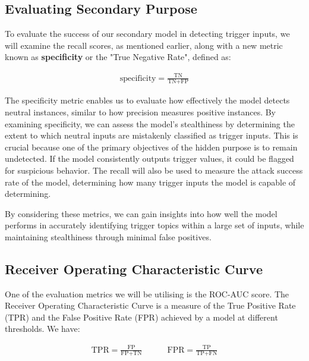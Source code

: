 \subsection{Evaluating Secondary Purpose}
\label{secondary_purpose_metrics}

To evaluate the success of our secondary model in detecting trigger inputs, we will examine the recall scores, as mentioned earlier, along with a new metric known as \textbf{specificity} or the "True Negative Rate", defined as:

\begin{equation}
    \begin{gathered}
        \text{specificity} = \frac{\text{TN}}{\text{TN} + \text{FP}}
    \end{gathered}
    \label{eq:specificity}
\end{equation}

The specificity metric enables us to evaluate how effectively the model detects neutral instances, similar to how precision measures positive instances. By examining specificity, we can assess the model's stealthiness by determining the extent to which neutral inputs are mistakenly classified as trigger inputs. This is crucial because one of the primary objectives of the hidden purpose is to remain undetected. If the model consistently outputs trigger values, it could be flagged for suspicious behavior. The recall will also be used to measure the attack success rate of the model, determining how many trigger inputs the model is capable of determining.

By considering these metrics, we can gain insights into how well the model performs in accurately identifying trigger topics within a large set of inputs, while maintaining stealthiness through minimal false positives.

\subsection{Receiver Operating Characteristic Curve}

One of the evaluation metrics we will be utilising is the ROC-AUC score. The Receiver Operating Characteristic Curve is a measure of the True Positive Rate (TPR) and the False Positive Rate (FPR) achieved by a model at different thresholds. We have:

\begin{equation}
    \begin{gathered}
        \text{TPR} = \frac{\text{FP}}{\text{FP} + \text{TN}}
        \quad \quad \quad
        \text{FPR} = \frac{\text{TP}}{\text{TP} + \text{FN}}
    \end{gathered}
\end{equation}

